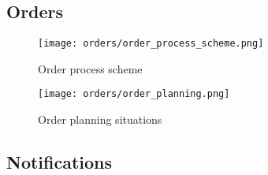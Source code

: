 \subsection{Orders}

\begin{figure}[h]\centering
	\texttt{[image: orders/order\_process\_scheme.png]}
	\caption{Order process scheme}\label{order-process-scheme}
\end{figure}

\begin{figure}[h]\centering
	\texttt{[image: orders/order\_planning.png]}
	\caption{Order planning situations}\label{order-process-scheme}
\end{figure} 
\subsection{Notifications}
